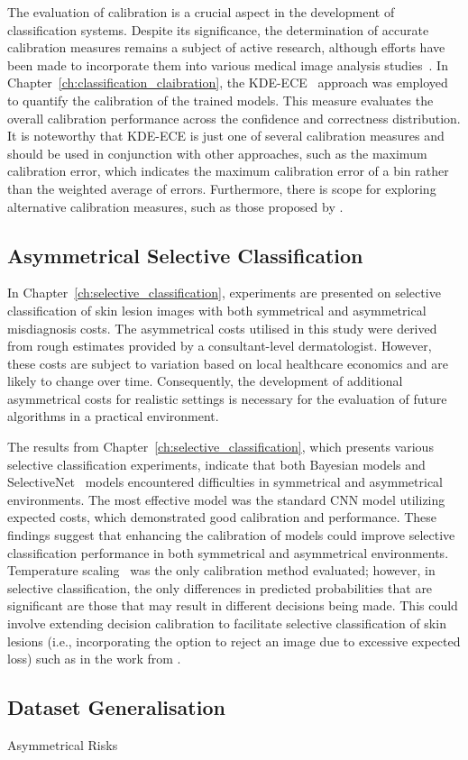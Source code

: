 The evaluation of calibration is a crucial aspect in the development of classification systems. Despite its significance, the determination of accurate calibration measures remains a subject of active research, although efforts have been made to incorporate them into various medical image analysis studies~\citep{maier2022metrics}. In Chapter~\ref{ch:classification_claibration}, the KDE-ECE~\citep{zhang2020mix} approach was employed to quantify the calibration of the trained models. This measure evaluates the overall calibration performance across the confidence and correctness distribution. It is noteworthy that KDE-ECE is just one of several calibration measures and should be used in conjunction with other approaches, such as the maximum calibration error, which indicates the maximum calibration error of a bin rather than the weighted average of errors. Furthermore, there is scope for exploring alternative calibration measures, such as those proposed by \cite{nixon2019measuring}.

\subsection{Asymmetrical Selective Classification}
In Chapter~\ref{ch:selective_classification}, experiments are presented on selective classification of skin lesion images with both symmetrical and asymmetrical misdiagnosis costs. The asymmetrical costs utilised in this study were derived from rough estimates provided by a consultant-level dermatologist. However, these costs are subject to variation based on local healthcare economics and are likely to change over time. Consequently, the development of additional asymmetrical costs for realistic settings is necessary for the evaluation of future algorithms in a practical environment.

The results from Chapter~\ref{ch:selective_classification}, which presents various selective classification experiments, indicate that both Bayesian models and SelectiveNet~\citep{geifman2019selectivenet} models encountered difficulties in symmetrical and asymmetrical environments. The most effective model was the standard CNN model utilizing expected costs, which demonstrated good calibration and performance. These findings suggest that enhancing the calibration of models could improve selective classification performance in both symmetrical and asymmetrical environments. Temperature scaling~\citep{guo2017calibration} was the only calibration method evaluated; however, in selective classification, the only differences in predicted probabilities that are significant are those that may result in different decisions being made. This could involve extending decision calibration to facilitate selective classification of skin lesions (i.e., incorporating the option to reject an image due to excessive expected loss) such as in the work from \cite{zhao2021calibrating}.


\subsection{Dataset Generalisation}
Asymmetrical Risks